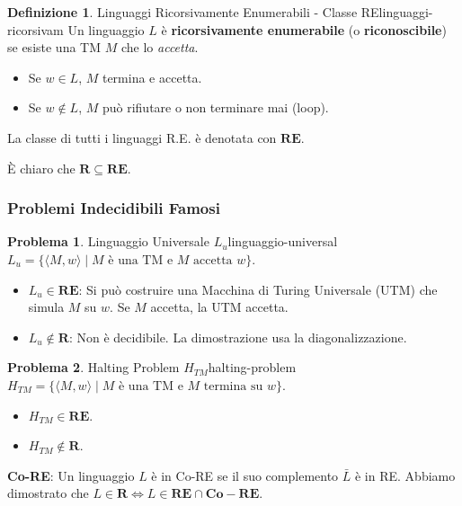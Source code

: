 \documentclass[a4paper]{article}
\theoremstyle{definition} %
\newtheorem{definition}{Definizione}
\newtheorem{problem}{Problema}[subsection]
\newcommand{\tuple}[1]{\langle#1\rangle}
\begin{document}
\begin{definition}{Linguaggi Ricorsivamente Enumerabili - Classe RE}{linguaggi-ricorsivam}
Un linguaggio $L$ è \textbf{ricorsivamente enumerabile} (o \textbf{riconoscibile}) se esiste una TM $M$ che lo \emph{accetta}.
\begin{itemize}
    \item Se $w \in L$, $M$ termina e accetta.
    \item Se $w \notin L$, $M$ può rifiutare o non terminare mai (loop).
\end{itemize}
La classe di tutti i linguaggi R.E. è denotata con $\mathbf{RE}$.
\end{definition}
È chiaro che $\mathbf{R} \subseteq \mathbf{RE}$.

\subsubsection{Problemi Indecidibili Famosi}
\begin{problem}{Linguaggio Universale $L_u$}{linguaggio-universal}
$L_u = \{ \tuple{M, w} \mid M \text{ è una TM e } M \text{ accetta } w \}$.
\begin{itemize}
    \item $L_u \in \mathbf{RE}$: Si può costruire una Macchina di Turing Universale (UTM) che simula $M$ su $w$. Se $M$ accetta, la UTM accetta.
    \item $L_u \notin \mathbf{R}$: Non è decidibile. La dimostrazione usa la diagonalizzazione.
\end{itemize}
\end{problem}
\begin{problem}{Halting Problem $H_{TM}$}{halting-problem}
$H_{TM} = \{ \tuple{M, w} \mid M \text{ è una TM e } M \text{ termina su } w \}$.
\begin{itemize}
    \item $H_{TM} \in \mathbf{RE}$.
    \item $H_{TM} \notin \mathbf{R}$.
\end{itemize}
\end{problem}
\textbf{Co-RE}: Un linguaggio $L$ è in Co-RE se il suo complemento $\bar{L}$ è in RE. Abbiamo dimostrato che $L \in \mathbf{R} \iff L \in \mathbf{RE} \cap \mathbf{Co-RE}$.
\end{document}
